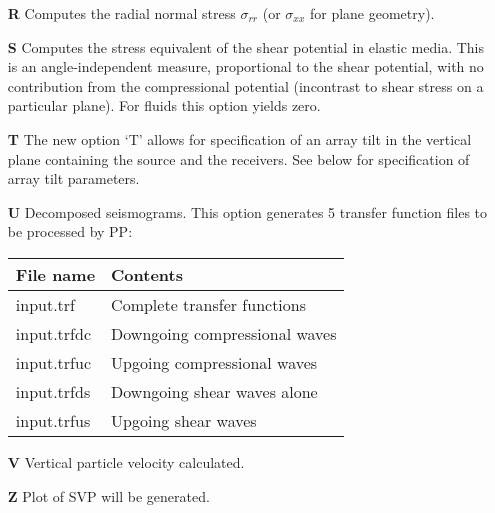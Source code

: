 \begin{itemize}
\item[{\bf R}] Computes the radial normal stress $\sigma_{rr}$
      (or $\sigma_{xx}$ for plane geometry).  \item[{\bf S}] Computes
      the stress equivalent of the shear potential in elastic
      media. This is an angle-independent measure, proportional to the
      shear potential, with no contribution from the compressional
      potential (incontrast to shear stress on a particular plane).
      For fluids this option yields zero.  
\item[{\bf T}] The new
      option `T' allows for specification of an array tilt in the
      vertical plane containing the source and the receivers.  See
      below for specification of array tilt parameters.  
\item[{\bf U}] Decomposed seismograms.  This option generates 5 transfer
      function files to be processed by PP:

          \begin{tabular}{ll}
          File name & Contents \\ \hline
          input.trf &     Complete transfer functions \\
          input.trfdc &    Downgoing compressional waves \\
          input.trfuc  &  Upgoing compressional waves  \\
          input.trfds  &  Downgoing  shear waves alone \\
          input.trfus &    Upgoing shear waves
          \end{tabular}
\item[{\bf V}] Vertical particle velocity calculated.
\item[{\bf Z}] Plot of SVP will be generated.


\end{itemize}
